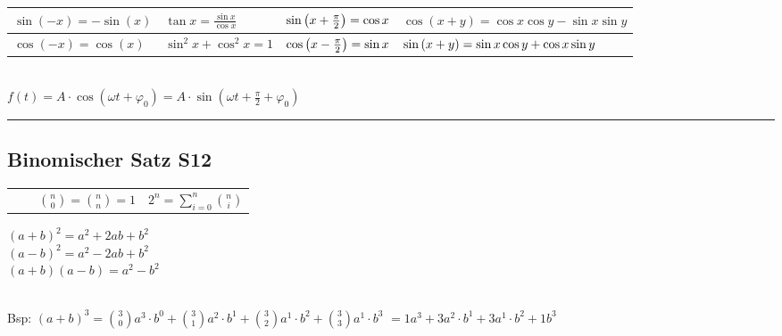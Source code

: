 		
		\begin{tabulary}{14cm}{|L|L|L|L|}
			\hline
			$ \sin (-x) = -\sin (x) $ 							& $ \tan x = \frac{\sin x}{\cos x} $  &  $\sin \left(x + \frac{\pi}{2}\right) = \cos x$ & $ \cos (x + y) = \cos x \cos y - \sin x \sin y $					\\ \hline
			
			$ \cos (-x) = \cos (x) $ 									& 	$\sin^2 x + \cos^2 x = 1$	 	& 	$\cos \left(x - \frac{\pi}{2}\right) = \sin x$		&$\sin \left(x + y\right) = \sin x \cos y + \cos x \sin y$	\\ \hline		
		\end{tabulary}\\

		$f(t)=A\cdot \cos(\omega t + \varphi_0)=A\cdot \sin(\omega t + \frac{\pi}{2}+ \varphi_0)$
		
	\vspace{1mm}
	\hrule
	\vspace{1mm}
		


		\begin{minipage}{0.37\textwidth}
			\subsection{Binomischer Satz \color{red} S12}%
			\label{par:fakultaeten}
			\begin{tabulary}{15cm}{Lccr}
				 \qquad	&	
				\qquad	& $\binom{n}{0} = \binom{n}{n} = 1$
				\qquad	& $ 2^{n}= \sum\limits_{i = 0}^{n}\binom{n}{i}  $\qquad\qquad 
				\\
			\end{tabulary}
		\end{minipage}%
		\vrule
		\hspace{2mm}
		\begin{minipage}{0.2\columnwidth}
				$ (a + b)^{2} = a^{2}+2ab+b^{2} $\\
				$ (a-b)^{2} = a^{2}-2ab+b^{2} $\\
				$ (a+b)(a-b) = a^{2}-b^{2} $\\
		\end{minipage}
		\\
		Bsp: $ (a+b)^{3}=\binom{3}{0}a^{3}\cdot b^{0} + \binom{3}{1}a^{2}\cdot b^{1}  +  \binom{3}{2}a^{1}\cdot b^{2}  +  \binom{3}{3}a^{1}\cdot b^{3}$  $ = 1a^{3}+3a^{2}\cdot b^{1}  +  3a^{1}\cdot b^{2}  +  1 b^{3}    $ 

